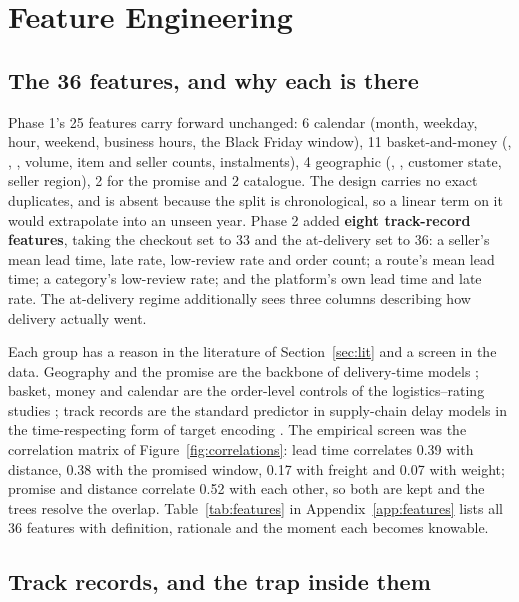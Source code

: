 \section{Feature Engineering}
\label{sec:features}

\subsection{The 36 features, and why each is there}

Phase 1's 25 features carry forward unchanged: 6 calendar (month, weekday, hour,
weekend, business hours, the Black Friday window), 11 basket-and-money
(, , , volume, item and
seller counts, instalments), 4 geographic (,
, customer state, seller region), 2 for the promise and 2
catalogue. The design carries no exact duplicates, and  is
absent because the split is chronological, so a linear term on it would
extrapolate into an unseen year. Phase 2 added \textbf{eight track-record
features}, taking the checkout set to 33 and the at-delivery set to 36: a
seller's mean lead time, late rate, low-review rate and order count; a route's
mean lead time; a category's low-review rate; and the platform's own lead time
and late rate. The at-delivery regime additionally sees three columns describing
how delivery actually went.

Each group has a reason in the literature of Section~\ref{sec:lit} and a
screen in the data. Geography and the promise are the backbone of delivery-time
models \citep{salari2022delivery, liu2021lastmile, cui2024promise}; basket,
money and calendar are the order-level controls of the logistics--rating
studies \citep{deshpande2023logistics}; track records are the standard
predictor in supply-chain delay models \citep{baryannis2019risk} in the
time-respecting form of target encoding \citep{miccibarreca2001target}. The
empirical screen was the correlation matrix of Figure~\ref{fig:correlations}:
lead time correlates 0.39 with distance, 0.38 with the promised window, 0.17
with freight and 0.07 with weight; promise and distance correlate 0.52 with
each other, so both are kept and the trees resolve the overlap.
Table~\ref{tab:features} in Appendix~\ref{app:features} lists all 36 features
with definition, rationale and the moment each becomes knowable.

\subsection{Track records, and the trap inside them}
\label{sec:history}

